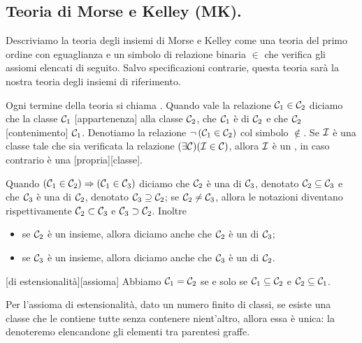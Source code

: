 \subsection{Teoria di Morse e Kelley (MK).}\label{MK}
\par Descriviamo la teoria degli insiemi di Morse e Kelley come una teoria del primo ordine con eguaglianza e un simbolo di relazione binaria $\in$ che verifica gli assiomi elencati di seguito. Salvo specificazioni contrarie, questa teoria sar\`a la nostra teoria degli insiemi di riferimento.
\begin{Definition}
	Ogni termine della teoria si chiama . Quando vale la relazione $\mathcal{C}_1 \in \mathcal{C}_2$ diciamo che la classe $\mathcal{C}_1$ [appartenenza] alla classe $\mathcal{C}_2$, che $\mathcal{C}_1$ \`e  di $\mathcal{C}_2$ e che $\mathcal{C}_2$ [contenimento] $\mathcal{C}_1$. Denotiamo la relazione $\neg \left ( \mathcal{C}_1 \in \mathcal{C}_2 \right )$ col simbolo $\notin$. Se $\mathcal{I}$ \`e una classe tale che sia verificata la relazione $(\exists \mathcal{C})(\mathcal{I} \in \mathcal{C})$, allora $\mathcal{I}$ \`e un , in caso contrario \`e una [propria][classe].
\end{Definition}
\begin{Definition}
	Quando $(\mathcal{C}_1 \in \mathcal{C}_2) \Rightarrow (\mathcal{C}_1 \in \mathcal{C}_3)$ diciamo che $\mathcal{C}_2$ \`e una  di $\mathcal{C}_3$, denotato $\mathcal{C}_2 \subseteq \mathcal{C}_3$ e che $\mathcal{C}_3$ \`e una  di $\mathcal{C}_2$, denotato $\mathcal{C}_3 \supseteq \mathcal{C}_2$; se $\mathcal{C}_2 \neq \mathcal{C}_3$, allora le notazioni diventano rispettivamente $\mathcal{C}_2 \subset \mathcal{C}_3$ e $\mathcal{C}_3 \supset \mathcal{C}_2$. Inoltre
	\begin{itemize}
		\item se $\mathcal{C}_2$ \`e un insieme, allora diciamo anche che $\mathcal{C}_2$ \`e un  di $\mathcal{C}_3$;
		\item se $\mathcal{C}_3$ \`e un insieme, allora diciamo anche che $\mathcal{C}_3$ \`e un  di $\mathcal{C}_2$.
	\end{itemize}
\end{Definition}
\begin{Axiom}
	[di estensionalit\`a][assioma] Abbiamo $\mathcal{C}_1 = \mathcal{C}_2$ se e solo se $\mathcal{C}_1 \subseteq \mathcal{C}_2$ e $\mathcal{C}_2 \subseteq \mathcal{C}_1$.
\end{Axiom}
\par Per l'assioma di estensionalit\`a, dato un numero finito di classi, se esiste una classe che le contiene tutte senza contenere nient'altro, allora essa \`e unica: la denoteremo elencandone gli elementi tra parentesi graffe.
